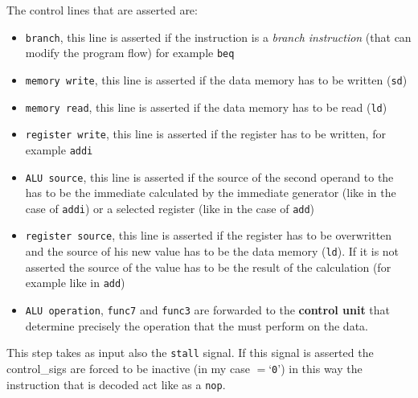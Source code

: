 \documentclass{article}
\begin{document}
The control lines that are asserted are:
\begin{itemize}
    \item \texttt{branch}, this line is asserted if the instruction is a \emph{branch instruction} (that can modify the program flow) for example \texttt{beq}
    \item \texttt{memory write}, this line is asserted if the data memory has to be written (\texttt{sd})
    \item \texttt{memory read}, this line is asserted if the data memory has to be read (\texttt{ld})
    \item \texttt{register write}, this line is asserted if the register has to be written, for example \texttt{addi}
    \item \texttt{ALU source}, this line is asserted if the source of the second operand to the \ALU has to be the immediate calculated by the immediate generator  (like in the case of \texttt{addi}) or a selected register (like in the case of \texttt{add})
    \item \texttt{register source}, this line is asserted if the register has to be overwritten and the source of his new value has to be the data memory (\texttt{ld}). If it is not asserted the source of the value has to be the result of the \ALU calculation (for example like in \texttt{add})
    \item \texttt{ALU operation}, \texttt{func7} and \texttt{func3} are forwarded to the \textbf{\ALU control unit}  that determine precisely the operation that the \ALU must perform on the data.
\end{itemize}

This step takes as input also the \texttt{stall} signal. If this signal is asserted the \glspl{control_sig} are forced to be inactive (in my case $=$`\texttt{0}') in this way the instruction that is decoded act like as a \texttt{nop}.
\end{document}
